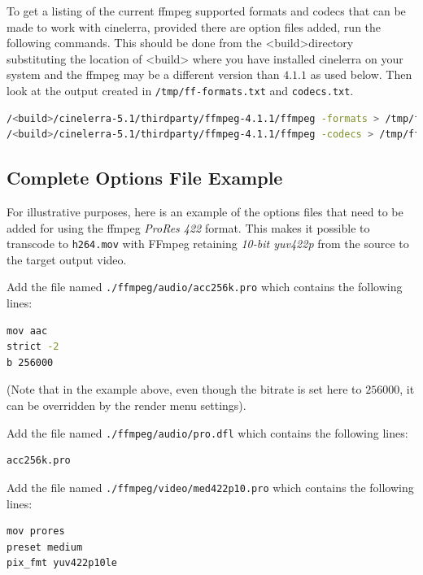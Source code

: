 To get a listing of the current ffmpeg supported formats and codecs that can be made to work with cinelerra, provided there are option files added, run the following commands.  This should be done from the <build>directory substituting the location of <build> where you have installed cinelerra on your system and the ffmpeg may be a different version than $4.1.1$ as used below.  Then look at the output created in \texttt{/tmp/ff-formats.txt} and \texttt{codecs.txt}.

\begin{lstlisting}[language=bash]
/<build>/cinelerra-5.1/thirdparty/ffmpeg-4.1.1/ffmpeg -formats > /tmp/ff-formats.txt
/<build>/cinelerra-5.1/thirdparty/ffmpeg-4.1.1/ffmpeg -codecs > /tmp/ff-codecs.txt
\end{lstlisting}

\subsection{Complete Options File Example}%
\label{sub:complete_options_file_example}

For illustrative purposes, here is an example of the options files that need to be added for using the ffmpeg \textit{ProRes 422} format. This makes it possible to transcode to \texttt{h264.mov} with FFmpeg retaining \textit{10-bit yuv422p} from the source to the target output video.

Add the file named  \texttt{./ffmpeg/audio/acc256k.pro} which contains the following lines:

\begin{lstlisting}[language=bash]
mov aac
strict -2
b 256000
\end{lstlisting}

(Note that in the example above, even though the bitrate is set here to $256000$, it can be 	overridden by the render menu settings).

Add the file named \texttt{./ffmpeg/audio/pro.dfl} which contains the following lines:

\begin{lstlisting}[language=bash]
acc256k.pro
\end{lstlisting}

Add the file named \texttt{./ffmpeg/video/med422p10.pro} which contains the following lines:

\begin{lstlisting}[language=bash]
mov prores
preset medium
pix_fmt yuv422p10le
\end{lstlisting}

